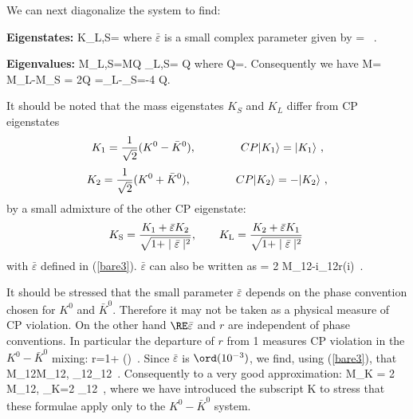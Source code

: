 We can next diagonalize the system to find:

{\bf Eigenstates:}
\be\label{KLS}
K_{L,S}=
        {}
\ee
where $\bar\varepsilon$ is a small complex parameter given by
\be\label{bare3}
=
~.
\ee

{\bf Eigenvalues:}
\be
M_{L,S}=M\pm \RE Q  \qquad \Gamma_{L,S}=\Gamma{} \IM Q
\ee
where
\be
Q=.
\ee
Consequently we have
\be\label{deltak}
\Delta M= M_L-M_S = 2\RE Q
\quad\quad
\Delta\Gamma=\Gamma_L-\Gamma_S=-4 \IM Q.
\ee

It should be noted that the mass eigenstates $K_S$ and $K_L$ differ from 
CP eigenstates
\begin{equation}
K_1={1\over{\sqrt 2}}(K^0-\bar K^0),
  \qquad\qquad CP|K_1\rangle=|K_1\rangle~,
\end{equation}
\begin{equation}
K_2={1\over{\sqrt 2}}(K^0+\bar K^0),
  \qquad\qquad CP|K_2\rangle=-|K_2\rangle~,
\end{equation}
by 
a small admixture of the
other CP eigenstate:
\begin{equation}
K_{\rm S}={{K_1+\bar\varepsilon K_2}
\over{\sqrt{1+\mid\bar\varepsilon\mid^2}}},
\qquad
K_{\rm L}={{K_2+\bar\varepsilon K_1}
\over{\sqrt{1+\mid\bar\varepsilon\mid^2}}}\,
\end{equation}
with $\bar\varepsilon$ defined in (\ref{bare3}).
$\bar\varepsilon$ can also be written as
\be\label{bare}
=
{2 M_{12}-i\Gamma_{12}}\equiv r\exp(i\kappa)~.
\ee

It should be stressed that
the small parameter $\bar\varepsilon$  depends on the 
phase convention
chosen for $K^0$ and $\bar K^0$. Therefore it may not 
be taken as a physical measure of CP violation.
On the other hand $\RE\bar\varepsilon$ and $r$ are independent of
phase conventions. In particular the departure of $r$ from 1
measures CP violation in the $K^0-\bar K^0$ mixing:
\be
r=1+
    \IM\left(\right)~.
\ee
Since $\bar\varepsilon$ is $\ord(10^{-3})$, we find, using (\ref{bare3}),
that
\be
\IM M_{12}\ll\RE M_{12}, \quad\quad 
\IM \Gamma_{12}\ll\RE \Gamma_{12}~.
\ee
Consequently to a very good approximation:
\be\label{deltak1}
\Delta M_K = 2 \RE M_{12}, \qquad \Delta\Gamma_K=2 \RE \Gamma_{12}~,
\ee
where we have introduced the subscript K to stress that these formulae apply
only to the $K^0-\bar K^0$ system.

